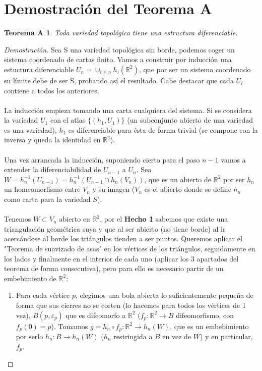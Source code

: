 \documentclass[11pt]{article}
\newtheorem*{teora}{Teorema A}
\begin{document}
\section{Demostración del Teorema A}

	\begin{teora}
		Toda variedad topológica tiene una estructura diferenciable.
	\end{teora}
	\begin{proof}[Demostración]
		Sea S una variedad topológica sin borde, podemos coger un sistema coordenado de cartas finito. Vamos a construir por inducción una estuctura diferenciable $U_n = \cup_{i\leq n}h_i(\mathbb{R}^2)$, que por ser un sistema coordenado su límite debe de ser S, probando así el resultado. Cabe destacar que cada $U_i$ contiene a todos los anteriores. \\
		\\ La inducción empieza tomando una carta cualquiera del sistema. Si se considera la variedad $U_1$ con el atlas $\{(h_1,U_1)\}$ (un subconjunto abierto de una variedad es una variedad), $h_1$ es diferenciable para ésta de forma trivial (se compone con la inversa y queda la identidad en $\mathbb{R}^2$).\\
		\\ Una vez arrancada la inducción, suponiendo cierto para el paso $n-1$ vamos a extender la diferenciabilidad de $U_{n-1}$ a $U_n$. Sea $W=h_n^{-1}(U_{n-1})=h_n^{-1}(U_{n-1}\cap h_n(V_n))$, que es un abierto de $\mathbb{R}^2$ por ser $h_n$ un homeomorfismo entre $V_n$ y su imagen ($V_n$ es el abierto donde se define $h_n$ como carta para la variedad $S$). \\
		\\ Tenemos $W\subset V_n$ abierto en $\mathbb{R}^2$, por el \textbf{Hecho 1} sabemos que existe una triangulación geométrica suya y que al ser abierto (no tiene borde) al ir acercándose al borde los triángulos tienden a ser puntos. Queremos aplicar el "Teorema de suavizado de asas" en los vértices de los triángulos, seguidamente en los lados y finalmente en el interior de cada uno (aplicar los 3 apartados del teorema de forma consecutiva), pero para ello es necesario partir de un embebimiento de $\mathbb{R}^2$:
		\begin{enumerate}
			\item Para cada vértice $p$, elegimos una bola abierta lo suficientemente pequeña de forma que sus cierres no se corten (lo hacemos para todos los vértices de 1 vez), $B(p,\varepsilon _p)$ que es difeomorfo a $\mathbb{R}^2$ ($f_p:\mathbb{R}^2\rightarrow B$ difeomorfismo, con $f_p(0)=p$). Tomamos $g=h_n\circ f_p:\mathbb{R}^2\rightarrow h_n(W)$, que es un embebimiento por serlo $h_n:B\rightarrow h_n(W)$ ($h_n$ restringida a $B$ en vez de $W$) y en particular, $f_p$. \\

\end{enumerate}
\end{proof}
\end{document}
